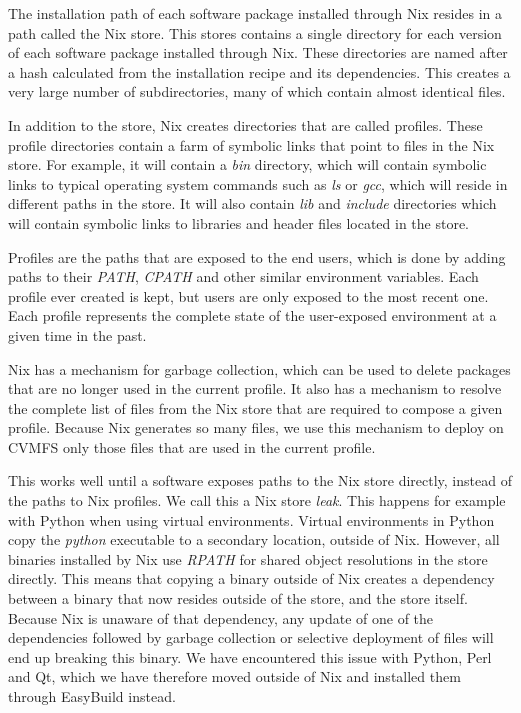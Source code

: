 \documentclass[sigconf]{acmart}
\begin{document}
The installation path of each software package installed through Nix resides in a path called the Nix store. This stores contains a single directory for each version of each software package installed through Nix. These directories are named after a hash calculated from the installation recipe and its dependencies. This creates a very large number of subdirectories, many of which contain almost identical files. 

In addition to the store, Nix creates directories that are called profiles. These profile directories contain a farm of symbolic links that point to files in the Nix store. For example, it will contain a {\it bin} directory, which will contain symbolic links to typical operating system commands such as {\it ls} or {\it gcc}, which will reside in different paths in the store. It will also contain {\it lib} and {\it include} directories which will contain symbolic links to libraries and header files located in the store. 

Profiles are the paths that are exposed to the end users, which is done by adding paths to their {\it PATH}, {\it CPATH} and other similar environment variables. Each profile ever created is kept, but users are only exposed to the most recent one. Each profile represents the complete state of the user-exposed environment at a given time in the past.

Nix has a mechanism for garbage collection, which can be used to delete packages that are no longer used in the current profile. It also has a mechanism to resolve the complete list of files from the Nix store that are required to compose a given profile. Because Nix generates so many files, we use this mechanism to deploy on CVMFS only those files that are used in the current profile. 

This works well until a software exposes paths to the Nix store directly, instead of the paths to Nix profiles. We call this a Nix store {\it leak}. This happens for example with Python when using virtual environments. Virtual environments in Python copy the {\it python} executable to a secondary location, outside of Nix. However, all binaries installed by Nix use {\it RPATH} for shared object resolutions in the store directly. This means that copying a binary outside of Nix creates a dependency between a binary that now resides outside of the store, and the store itself. Because Nix is unaware of that dependency, any update of one of the dependencies followed by garbage collection or selective deployment of files will end up breaking this binary. We have encountered this issue with Python, Perl and Qt, which we have therefore moved outside of Nix and installed them through EasyBuild instead.
\end{document}
